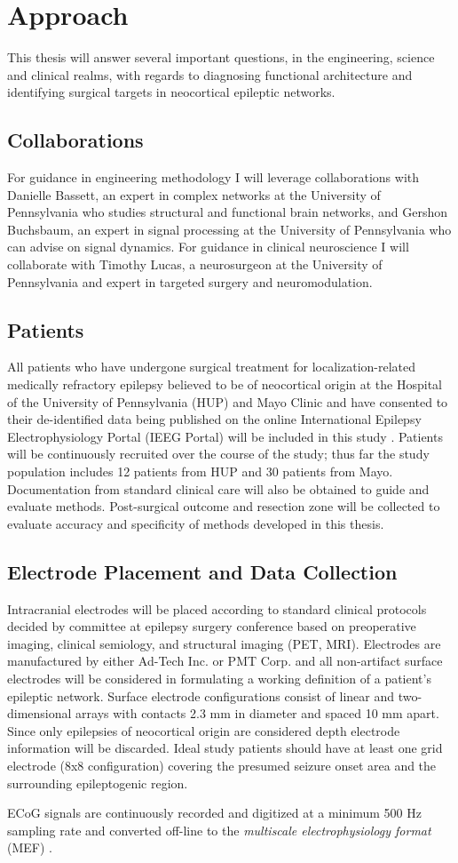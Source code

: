 \section{Approach}
This thesis will answer several important questions, in the engineering, science and clinical realms, with regards to diagnosing functional architecture and identifying surgical targets in neocortical epileptic networks.

\subsection{Collaborations}
\label{subsec:collaborations}
For guidance in engineering methodology I will leverage collaborations with Danielle Bassett, an expert in complex networks at the University of Pennsylvania who studies structural and functional brain networks, and Gershon Buchsbaum, an expert in signal processing at the University of Pennsylvania who can advise on signal dynamics. For guidance in clinical neuroscience I will collaborate with Timothy Lucas, a neurosurgeon at the University of Pennsylvania and expert in targeted surgery and neuromodulation.

\subsection{Patients}
\label{subsec:patients}
All patients who have undergone surgical treatment for localization-related medically refractory epilepsy believed to be of neocortical origin at the Hospital of the University of Pennsylvania (HUP) and Mayo Clinic and have consented to their de-identified data being published on the online International Epilepsy Electrophysiology Portal (IEEG Portal) will be included in this study \cite{wagenaar2013multimodal}. Patients will be continuously recruited over the course of the study; thus far the study population includes 12 patients from HUP and 30 patients from Mayo. Documentation from standard clinical care will also be obtained to guide and evaluate methods. Post-surgical outcome and resection zone will be collected to evaluate accuracy and specificity of methods developed in this thesis.

\subsection{Electrode Placement and Data Collection}
\label{subsec:elecdata}
Intracranial electrodes will be placed according to standard clinical protocols decided by committee at epilepsy surgery conference based on preoperative imaging, clinical semiology, and structural imaging (PET, MRI). Electrodes are manufactured by either Ad-Tech Inc. or PMT Corp. and all non-artifact surface electrodes will be considered in formulating a working definition of a patient's epileptic network. Surface electrode configurations consist of linear and two-dimensional arrays with contacts 2.3 mm in diameter and spaced 10 mm apart. Since only epilepsies of neocortical origin are considered depth electrode information will be discarded. Ideal study patients should have at least one grid electrode (8x8 configuration) covering the presumed seizure onset area and the surrounding epileptogenic region.

ECoG signals are continuously recorded and digitized at a minimum 500 Hz sampling rate and converted off-line to the \textit{multiscale electrophysiology format} (MEF) \cite{brinkmann2009large-scale}.
